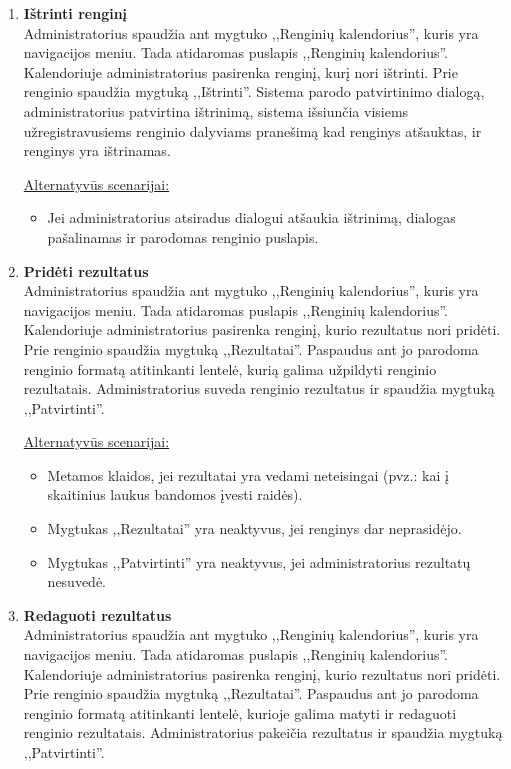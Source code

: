 \documentclass{VUMIFPSkursinis}
\begin{document}
\begin{enumerate} [label = \textbf{U\arabic*.}]
			\item \textbf{Ištrinti renginį}   \\
					Administratorius spaudžia ant mygtuko ,,Renginių kalendorius'', kuris yra navigacijos meniu. Tada atidaromas puslapis ,,Renginių kalendorius''. Kalendoriuje administratorius pasirenka renginį, kurį nori ištrinti. Prie renginio spaudžia mygtuką ,,Ištrinti''. Sistema parodo patvirtinimo dialogą, administratorius patvirtina ištrinimą, sistema išsiunčia visiems užregistravusiems renginio dalyviams pranešimą kad renginys atšauktas, ir renginys yra ištrinamas.
					
					\underline{Alternatyvūs scenarijai:}
					\begin{itemize}
						\item Jei administratorius atsiradus dialogui atšaukia ištrinimą, dialogas pašalinamas ir parodomas renginio puslapis.
					\end{itemize}
				
			\item \textbf{Pridėti rezultatus}   \\
					Administratorius spaudžia ant mygtuko ,,Renginių kalendorius'', kuris yra navigacijos meniu. Tada atidaromas puslapis ,,Renginių kalendorius''. Kalendoriuje administratorius pasirenka renginį, kurio rezultatus nori pridėti. Prie renginio spaudžia mygtuką ,,Rezultatai''. Paspaudus ant jo parodoma renginio formatą atitinkanti lentelė, kurią galima užpildyti renginio rezultatais. Administratorius suveda renginio rezultatus ir spaudžia mygtuką ,,Patvirtinti''.
					
					\underline{Alternatyvūs scenarijai:}
					\begin{itemize}
						\item Metamos klaidos, jei rezultatai yra vedami neteisingai (pvz.: kai į skaitinius laukus bandomos įvesti raidės).
						\item Mygtukas ,,Rezultatai'' yra neaktyvus, jei renginys dar neprasidėjo.
						\item Mygtukas ,,Patvirtinti'' yra neaktyvus, jei administratorius rezultatų nesuvedė.
					\end{itemize}
					
			\item \textbf{Redaguoti rezultatus}   \\
					Administratorius spaudžia ant mygtuko ,,Renginių kalendorius'', kuris yra navigacijos meniu. Tada atidaromas puslapis ,,Renginių kalendorius''. Kalendoriuje administratorius pasirenka renginį, kurio rezultatus nori pridėti. Prie renginio spaudžia mygtuką ,,Rezultatai''. Paspaudus ant jo parodoma renginio formatą atitinkanti lentelė, kurioje galima matyti ir redaguoti renginio rezultatais. Administratorius pakeičia rezultatus ir spaudžia mygtuką ,,Patvirtinti''.
					

\end{enumerate}
\end{document}
